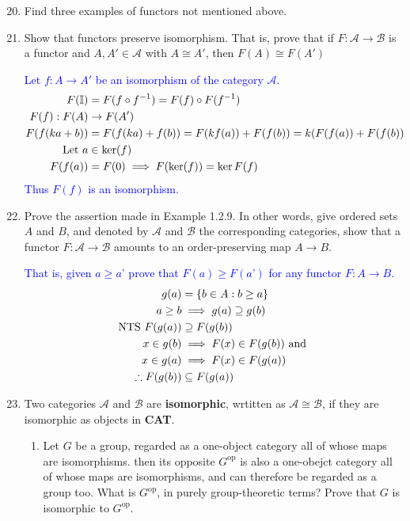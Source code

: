 \documentclass[12pt,a4paper]{report}
\newcommand{\BLUE}[1]{\textcolor{blue}{#1}}
\newcommand{\OP}{{\operatorname{op}}}
\newcommand{\II}{\mathbb{I}}
\newcommand{\CAT}[1]{\mathscr{#1}}
\begin{document}
\begin{enumerate}[label=1.2.\arabic*]
\setcounter{enumi}{19}

\item Find three examples of functors not mentioned above.

\item Show that functors preserve isomorphism.  That is, prove that if $F: \CAT{A}\to \CAT{B}$ is a functor and $A, A' \in \CAT{A}$ with $A \cong A'$, then $F(A) \cong F(A')$

\BLUE{Let $f: A \to A'$ be an isomorphism of the category $\CAT{A}$.
\begin{align*}
	F(\II) &= F(f\circ f^{-1}) = F(f)\circ F(f^{-1}) \\
	F(f): F(A) &\to F(A') \\
	F(f(ka+b)) &= F(f(ka)+f(b)) = F(kf(a))+F(f(b)) = k(F(f(a))+F(f(b)) \\
	\LET a &\in \ker(f) \\
	F(f(a)) &= F(0) \implies F(\ker(f)) = \ker F(f)
\end{align*}Thus $F(f)$ is an isomorphism.
}

\item Prove the assertion made in Example 1.2.9. In other words, give ordered sets $A$ and $B$, and denoted by $\CAT{A}$ and $\CAT{B}$ the corresponding categories, show that a functor $F: \CAT{A}\to \CAT{B}$ amounts to an order-preserving map $A \to B$.

\BLUE{That is, given $a \ge a’$ prove that $F(a) \ge F(a’)$ for any functor $F: A \to B$. 
\begin{align*}
	g(a) &= \{b \in A : b \ge a\}\\
	a \ge b &\implies g(a) \supseteq g(b) \\
	\text{NTS } F(g(a)) &\supseteq F(g(b)) \\
	x \in g(b) &\implies F(x) \in F(g(b)) \text{ and } \\
	x \in g(a) &\implies F(x) \in F(g(a)) \\
	\therefore F(g(b)) &\subseteq F(g(a))
\end{align*}
}

\item Two categories $\CAT{A}$ and $\CAT{B}$ are \textbf{isomorphic}, wrtitten as $\CAT{A} \cong \CAT{B}$, if they are isomorphic as objects in \textbf{CAT}.
\begin{enumerate}
	\item Let $G$ be a group, regarded as a one-object category all of whose maps are isomorphisms.  then its opposite $G^\OP$ is also a one-obejct category all of whose maps are isomorphisms, and can therefore be regarded as a group too.  What is $G^\OP$, in purely group-theoretic terms?  Prove that $G$ is isomorphic to $G^\OP$.
	

\end{enumerate}
\end{enumerate}
\end{document}
